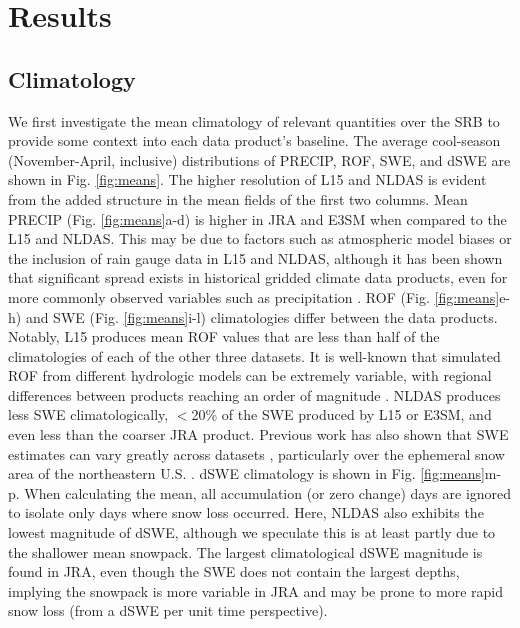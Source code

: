 \documentclass[nhess, manuscript]{copernicus}
\begin{document}
\section{Results}
\label{sec:results}

\subsection{Climatology}
\label{subsec:climatology}

We first investigate the mean climatology of relevant quantities over the SRB to provide some context into each data product's baseline.
The average cool-season (November-April, inclusive) distributions of PRECIP, ROF, SWE, and dSWE are shown in Fig. \ref{fig:means}.
The higher resolution of L15 and NLDAS is evident from the added structure in the mean fields of the first two columns.
Mean PRECIP (Fig. \ref{fig:means}a-d) is higher in JRA and E3SM when compared to the L15 and NLDAS.
This may be due to factors such as atmospheric model biases or the inclusion of rain gauge data in L15 and NLDAS, although it has been shown that significant spread exists in historical gridded climate data products, even for more commonly observed variables such as precipitation \citep{gutmann2012comparison,livneh2014filling,henn2018an}.
ROF (Fig. \ref{fig:means}e-h) and SWE (Fig. \ref{fig:means}i-l) climatologies differ between the data products.
Notably, L15 produces mean ROF values that are less than half of the climatologies of each of the other three datasets.
It is well-known that simulated ROF from different hydrologic models can be extremely variable, with regional differences between products reaching an order of magnitude \citep{gudmundsson2012comparing,sood2015global,beck2017global}.
NLDAS produces less SWE climatologically, $<$20\% of the SWE produced by L15 or E3SM, and even less than the coarser JRA product.
Previous work has also shown that SWE estimates can vary greatly across datasets \citep{lundquist2015high,Rhoades2018a}, particularly over the ephemeral snow area of the northeastern U.S. \citep{mccrary2017evaluation,mccrary2022projections}.
dSWE climatology is shown in Fig. \ref{fig:means}m-p.
When calculating the mean, all accumulation (or zero change) days are ignored to isolate only days where snow loss occurred.
Here, NLDAS also exhibits the lowest magnitude of dSWE, although we speculate this is at least partly due to the shallower mean snowpack.
The largest climatological dSWE magnitude is found in JRA, even though the SWE does not contain the largest depths, implying the snowpack is more variable in JRA and may be prone to more rapid snow loss (from a dSWE per unit time perspective).
\end{document}
